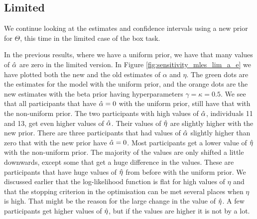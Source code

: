 
\subsection{Limited}
We continue looking at the estimates and confidence intervals using a new prior for $\Theta$, this time in the limited case of the box task. 

In the previous results, where we have a uniform prior, we have that many values of $\hat{\alpha}$ are zero in the limited version. In Figure \ref{fig:sensitivity_mles_lim_a_e} we have plotted both the new and the old estimates of $\alpha$ and $\eta$. The green dots are the estimates for the model with the uniform prior, and the orange dots are the new estimates with the beta prior having hyperparameters $\gamma=\kappa=0.5$. 
We see that all participants that have $\hat{\alpha}=0$ with the uniform prior, still have that with the non-uniform prior. 
The two participants with high values of $\hat{\alpha}$, individuals 11 and 13, get even higher values of $\hat{\alpha}$. Their values of $\hat{\eta}$ are slightly higher with the new prior. 
There are three participants that had values of $\hat{\alpha}$ slightly higher than zero that with the new prior have $\hat{\alpha}=0$. 
Most participants get a lower value of $\hat{\eta}$ with the non-uniform prior. The majority of the values are only shifted a little downwards, except some that get a huge difference in the values. These are participants that have huge values of $\hat{\eta}$ from before with the uniform prior. We discussed earlier that the log-likelihood function is flat for high values of $\eta$ and that the stopping criterion in the optimisation can be met several places when $\eta$ is high. That might be the reason for the large change in the value of $\hat{\eta}$. 
A few participants get higher values of $\hat{\eta}$, but if the values are higher it is not by a lot. 
